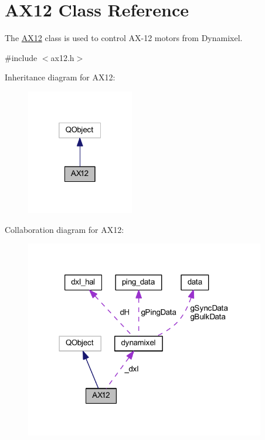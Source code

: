 \hypertarget{class_a_x12}{}\section{A\+X12 Class Reference}
\label{class_a_x12}


The \hyperlink{class_a_x12}{A\+X12} class is used to control A\+X-\/12 motors from Dynamixel.  




{\ttfamily \#include $<$ax12.\+h$>$}



Inheritance diagram for A\+X12\+:\nopagebreak
\begin{figure}[H]
\begin{center}
\leavevmode
\includegraphics[width=133pt]{db/dc9/class_a_x12__inherit__graph}
\end{center}
\end{figure}


Collaboration diagram for A\+X12\+:\nopagebreak
\begin{figure}[H]
\begin{center}
\leavevmode
\includegraphics[width=297pt]{d4/dc1/class_a_x12__coll__graph}
\end{center}
\end{figure}
